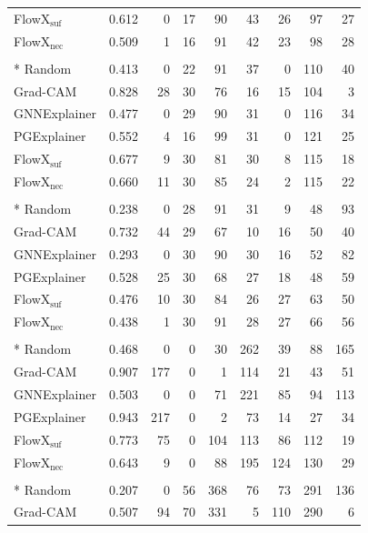 {\begin{longtable}{@{}lrr rrr rrr@{}}
FlowX$_{\mathrm{suf}}$ & 0.612 & 0 & 17 & 90 & 43 & 26 & 97 & 27 \\
FlowX$_{\mathrm{nec}}$ & 0.509 & 1 & 16 & 91 & 42 & 23 & 98 & 28 \\
\addlinespace
\multicolumn{9}{@{}l}{\textbf{BA-HouseANDGrid} ($n=150$)}\\*
Random & 0.413 & 0 & 22 & 91 & 37 & 0 & 110 & 40 \\
Grad-CAM & 0.828 & 28 & 30 & 76 & 16 & 15 & 104 & 3 \\
GNNExplainer & 0.477 & 0 & 29 & 90 & 31 & 0 & 116 & 34 \\
PGExplainer & 0.552 & 4 & 16 & 99 & 31 & 0 & 121 & 25 \\
FlowX$_{\mathrm{suf}}$ & 0.677 & 9 & 30 & 81 & 30 & 8 & 115 & 18 \\
FlowX$_{\mathrm{nec}}$ & 0.660 & 11 & 30 & 85 & 24 & 2 & 115 & 22 \\
\addlinespace
\multicolumn{9}{@{}l}{\textbf{BA-HouseORGrid} ($n=150$)}\\*
Random & 0.238 & 0 & 28 & 91 & 31 & 9 & 48 & 93 \\
Grad-CAM & 0.732 & 44 & 29 & 67 & 10 & 16 & 50 & 40 \\
GNNExplainer & 0.293 & 0 & 30 & 90 & 30 & 16 & 52 & 82 \\
PGExplainer & 0.528 & 25 & 30 & 68 & 27 & 18 & 48 & 59 \\
FlowX$_{\mathrm{suf}}$ & 0.476 & 10 & 30 & 84 & 26 & 27 & 63 & 50 \\
FlowX$_{\mathrm{nec}}$ & 0.438 & 1 & 30 & 91 & 28 & 27 & 66 & 56 \\
\addlinespace
\multicolumn{9}{@{}l}{\textbf{Tree-Cycles} ($n=292$)}\\*
Random & 0.468 & 0 & 0 & 30 & 262 & 39 & 88 & 165 \\
Grad-CAM & 0.907 & 177 & 0 & 1 & 114 & 21 & 43 & 51 \\
GNNExplainer & 0.503 & 0 & 0 & 71 & 221 & 85 & 94 & 113 \\
PGExplainer & 0.943 & 217 & 0 & 2 & 73 & 14 & 27 & 34 \\
FlowX$_{\mathrm{suf}}$ & 0.773 & 75 & 0 & 104 & 113 & 86 & 112 & 19 \\
FlowX$_{\mathrm{nec}}$ & 0.643 & 9 & 0 & 88 & 195 & 124 & 130 & 29 \\
\addlinespace
\multicolumn{9}{@{}l}{\textbf{BA-2Motifs} ($n=500$)}\\*
Random & 0.207 & 0 & 56 & 368 & 76 & 73 & 291 & 136 \\
Grad-CAM & 0.507 & 94 & 70 & 331 & 5 & 110 & 290 & 6 \\

\end{longtable}}
